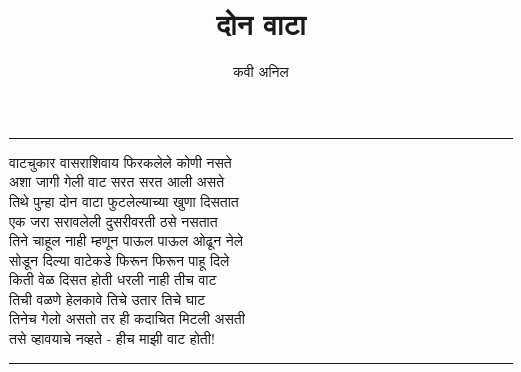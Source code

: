 \documentclass[17pt]{extarticle}  %
\begin{document}
\title{दोन वाटा}
\author{कवी अनिल}


\date{}
\maketitle
\hrule
\vspace{5mm}

वाटचुकार वासराशिवाय फिरकलेले कोणी नसते\\
अशा जागी गेली वाट सरत सरत आली असते\\
तिथे पुन्हा दोन वाटा फुटलेल्याच्या खुणा दिसतात\\
एक जरा सरावलेली दुसरीवरती ठसे नसतात\\
तिने चाहूल नाही म्हणून पाऊल पाऊल ओढून नेले\\
सोडून दिल्या वाटेकडे फिरून फिरून पाहू दिले\\
किती वेळ दिसत होती धरली नाही तीच वाट\\
तिची वळणे हेलकावे तिचे उतार तिचे घाट\\
तिनेच गेलो असतो तर ही कदाचित मिटली असती\\
तसे व्हावयाचे नव्हते - हीच माझी वाट होती!\\
                       
\vspace{5mm}
\hrule
\end{document}
